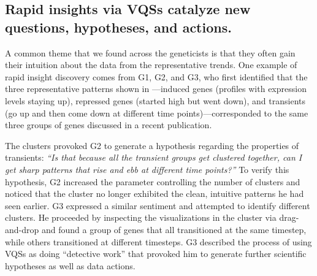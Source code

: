 \subsection{Rapid insights via VQSs catalyze new questions, hypotheses, and actions.}
\par {}
\par A common theme that we found across the geneticists is that they often gain their intuition about the data from the representative trends. One example of rapid insight discovery comes from G1, G2, and G3, who first identified that the three representative patterns shown in \zv---induced genes (profiles with expression levels staying up), repressed genes (started high but went down), and transients (go up and then come down at different time points)---corresponded to the same three groups of genes discussed in a recent publication\cite{Gloss2017}. 
\par The clusters provoked G2 to generate a hypothesis regarding the properties of transients: \textit{``Is that because all the transient groups get clustered together, can I get sharp patterns that rise and ebb at different time points?''} To verify this hypothesis, G2 increased the parameter controlling the number of clusters and noticed that the cluster no longer exhibited the clean, intuitive patterns he had seen earlier. G3 expressed a similar sentiment and attempted to identify different clusters. He proceeded by inspecting the visualizations in the cluster via drag-and-drop and found a group of genes that all transitioned at the same timestep, while others transitioned at different timesteps. G3 described the process of using VQSs as doing ``detective work'' that provoked him to generate further scientific hypotheses as well as data actions.